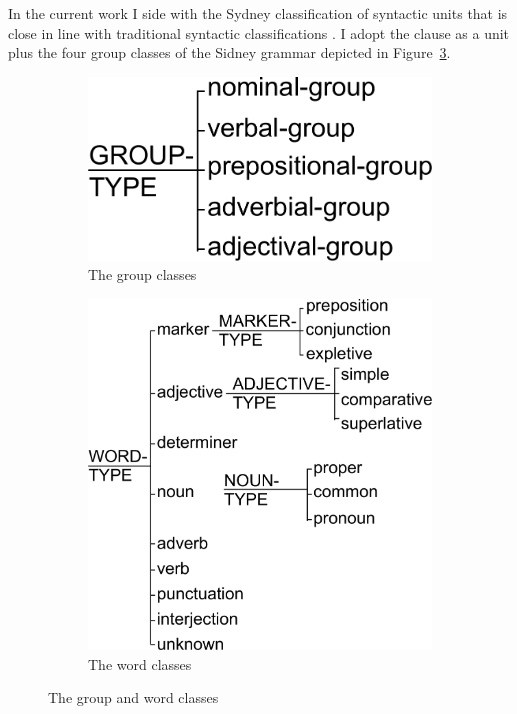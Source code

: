 In the current work I side with the Sydney classification of syntactic units that is close in line with traditional syntactic classifications \citep{Quirk1985}. I adopt the clause as a unit plus the four group classes of the Sidney grammar depicted in \mbox{Figure \ref{fig:group-classes}}. 

\begin{figure}[H]
	\centering
	\begin{subfigure}{.5\textwidth}
		\centering
		\includegraphics[width=0.57\linewidth]{Figures/SFL-grammar/group-classes.pdf}
		\caption{The group classes}
		\label{fig:group-classes-sub1}
	\end{subfigure}%
	\begin{subfigure}{.5\textwidth}
		\centering
		\includegraphics[width=0.9\linewidth]{Figures/SFL-grammar/word-classes.pdf}
		\caption{The word classes}
		\label{fig:group-classes-sub2}
	\end{subfigure}
	\caption{The group and word classes}
	\label{fig:group-classes}
\end{figure}

